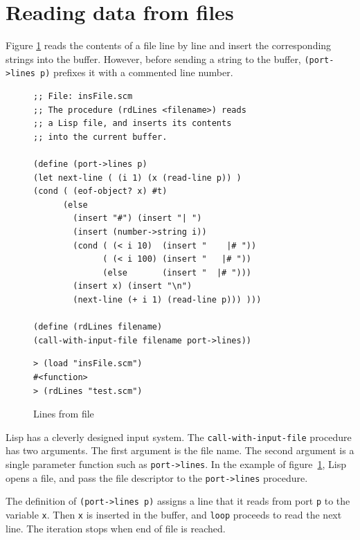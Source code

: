 \documentclass[a4paper,12pt]{book}
\newenvironment{fmpage}[1]
           {\begin{lrbox}{\fmbox}\begin{minipage}{#1}}
           {\end{minipage}\end{lrbox}\fbox{\usebox{\fmbox}}}
\begin{document}
\section{Reading data from files}

Figure \ref{rdFile} reads the contents
of a file line by line and insert
the corresponding
strings into the buffer. However, before
sending a string to the buffer,
\verb|(port->lines p)| prefixes it
with a commented line number.

\begin{figure}[!h]
\begin{fmpage}{\linewidth}
\begin{verbatim}
;; File: insFile.scm
;; The procedure (rdLines <filename>) reads
;; a Lisp file, and inserts its contents
;; into the current buffer.

(define (port->lines p)
(let next-line ( (i 1) (x (read-line p)) )
(cond ( (eof-object? x) #t)
      (else 
        (insert "#") (insert "| ")
        (insert (number->string i))
        (cond ( (< i 10)  (insert "    |# "))
              ( (< i 100) (insert "   |# "))
              (else       (insert "  |# ")))
        (insert x) (insert "\n")
        (next-line (+ i 1) (read-line p))) )))

(define (rdLines filename)
(call-with-input-file filename port->lines))
\end{verbatim}
\end{fmpage}

\begin{fmpage}{\linewidth}
\begin{verbatim}
> (load "insFile.scm")
#<function>
> (rdLines "test.scm")
\end{verbatim}
\end{fmpage}
\caption{Lines from file}
\label{rdFile}
\end{figure}

Lisp has a cleverly designed input system.
The  
\verb|call-with-input-file| \label{page:call-with-input-file}
procedure has two arguments. The first
argument is the file name. 
The second argument is
a single parameter function such
as \verb|port->lines|. In the example
of figure~\ref{rdFile}, Lisp 
opens a file, and pass the file descriptor
to the \verb|port->lines| procedure.

The definition of \verb|(port->lines p)|
assigns a line that it reads 
from port \verb|p|
to the variable \verb|x|. Then \verb|x|
is inserted in the buffer, and \verb|loop|
proceeds to read the next line.
The iteration stops when 
end of file is reached.
\end{document}
